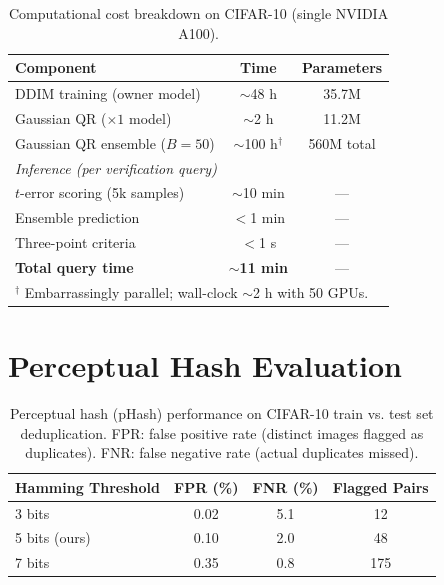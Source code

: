 \documentclass{article}
\begin{document}
\begin{table}[h]
\caption{Computational cost breakdown on CIFAR-10 (single NVIDIA A100).}
\label{tab:cost}
\vskip 0.1in
\begin{center}
\begin{small}
\begin{tabular}{lcc}
\toprule
Component & Time & Parameters \\
\midrule
DDIM training (owner model) & $\sim$48 h & 35.7M \\
Gaussian QR ($\times 1$ model) & $\sim$2 h & 11.2M \\
Gaussian QR ensemble ($B{=}50$) & $\sim$100 h$^\dagger$ & 560M total \\
\midrule
\multicolumn{3}{l}{\textit{Inference (per verification query)}} \\
$t$-error scoring (5k samples) & $\sim$10 min & --- \\
Ensemble prediction & $<$1 min & --- \\
Three-point criteria & $<$1 s & --- \\
\midrule
\textbf{Total query time} & \textbf{$\sim$11 min} & --- \\
\bottomrule
\multicolumn{3}{l}{\footnotesize $^\dagger$ Embarrassingly parallel; wall-clock $\sim$2 h with 50 GPUs.} \\
\end{tabular}
\end{small}
\end{center}
\end{table}

\section{Perceptual Hash Evaluation}
\label{app:phash}

\begin{table}[h]
\caption{Perceptual hash (pHash) performance on CIFAR-10 train vs. test set deduplication. FPR: false positive rate (distinct images flagged as duplicates). FNR: false negative rate (actual duplicates missed).}
\begin{center}
\begin{tabular}{lccc}
\toprule
Hamming Threshold & FPR (\%) & FNR (\%) & Flagged Pairs \\
\midrule
3 bits & 0.02 & 5.1 & 12 \\
5 bits (ours) & 0.10 & 2.0 & 48 \\
7 bits & 0.35 & 0.8 & 175 \\
\bottomrule
\end{tabular}
\end{center}
\end{table}
\end{document}
